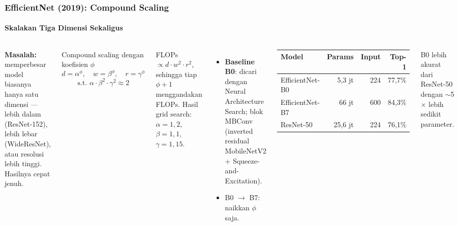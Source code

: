 \documentclass[t,aspectratio=169,xcolor=dvipsnames]{beamer}
\begin{document}
\begin{frame}
    \frametitle{EfficientNet (2019): Compound Scaling}
    \framesubtitle{Skalakan Tiga Dimensi Sekaligus}
    \footnotesize

    \begin{columns}[T]
        \textbf{Masalah:} memperbesar model biasanya hanya satu dimensi --- lebih dalam (ResNet-152), lebih lebar (WideResNet), atau resolusi lebih tinggi. Hasilnya cepat jenuh.
        \begin{exampleblock}{Compound scaling dengan koefisien $\phi$}
            $$d=\alpha^{\phi},\quad w=\beta^{\phi},\quad r=\gamma^{\phi}$$
            $$\text{s.t. } \alpha\cdot\beta^2\cdot\gamma^2\approx 2$$
        \end{exampleblock}
        {\scriptsize FLOPs $\propto d\cdot w^2\cdot r^2$, sehingga tiap $\phi+1$ menggandakan FLOPs. Hasil grid search: $\alpha=1{,}2$, $\beta=1{,}1$, $\gamma=1{,}15$.}

        \begin{itemize}
            \item \textbf{Baseline B0}: dicari dengan Neural Architecture Search; blok MBConv (inverted residual MobileNetV2 + Squeeze-and-Excitation).
            \item B0 $\to$ B7: naikkan $\phi$ saja.
        \end{itemize}
        \vspace{4pt}
        \begin{center}
        \begin{tabular}{lrrr}
            \toprule
            \textbf{Model} & \textbf{Params} & \textbf{Input} & \textbf{Top-1} \\
            \midrule
            EfficientNet-B0 & 5,3 jt & 224 & 77,7\% \\
            EfficientNet-B7 & 66 jt & 600 & 84,3\% \\
            ResNet-50 & 25,6 jt & 224 & 76,1\% \\
            \bottomrule
        \end{tabular}
        \end{center}
        {\scriptsize\color{dlMute} B0 lebih akurat dari ResNet-50 dengan $\sim$5$\times$ lebih sedikit parameter.}
    \end{columns}
\end{frame}

\end{document}
